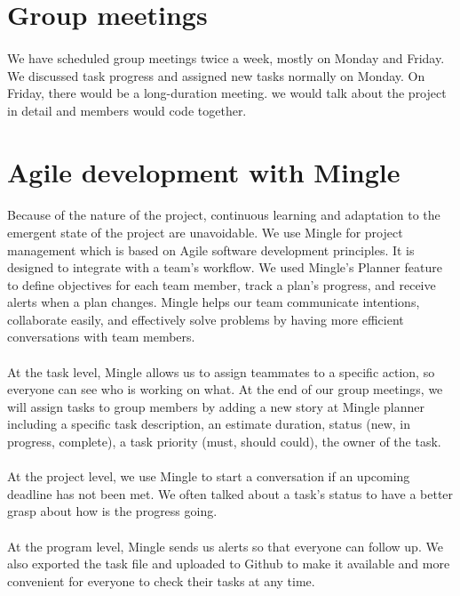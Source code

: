 \documentclass[a4paper,11pt,titlepage]{article}
\begin{document}
\section{Group meetings}
\paragraph{}
We have scheduled group meetings twice a week, mostly on Monday and Friday. We discussed task progress and assigned new tasks normally on Monday. On Friday, there would be a long-duration meeting. we would talk about the project in detail and members would code together.
\section{Agile development with Mingle}
\paragraph{}
Because of the nature of the project, continuous learning and adaptation to the emergent state of the project are unavoidable. We use Mingle for project management which is based on Agile software development principles. It is designed to integrate with a team's workflow. We used Mingle's Planner feature to define objectives for each team member, track a plan's progress, and receive alerts when a plan changes. Mingle helps our team communicate intentions, collaborate easily, and effectively solve problems by having more efficient conversations with team members.
\paragraph{}
At the task level, Mingle allows us to assign teammates to a specific action, so everyone can see who is working on what. At the end of our group meetings, we will assign tasks to group members by adding a new story at Mingle planner including a specific task description, an estimate duration, status (new, in progress, complete), a task priority (must, should could), the owner of the task. 
\paragraph{}
At the project level, we use Mingle to start a conversation if an upcoming deadline has not been met. We often talked about a task's status to have a better grasp about how is the progress going.
\paragraph{}
At the program level, Mingle sends us alerts so that everyone can follow up. We also exported the task file and uploaded to Github to make it available and more convenient for everyone to check their tasks at any time.
 
\end{document}
